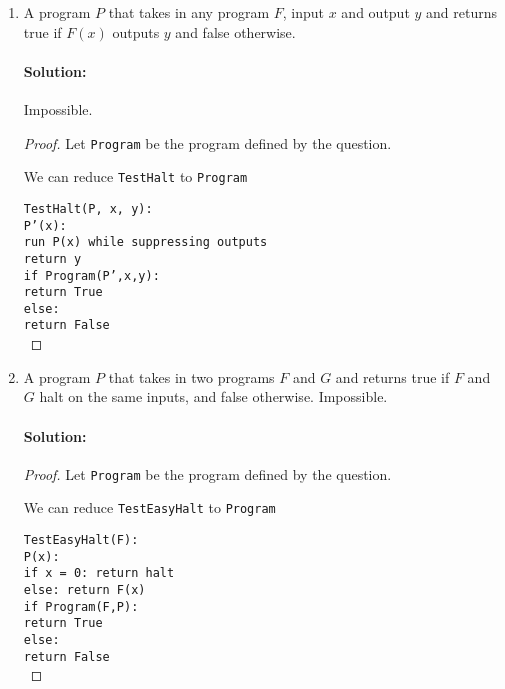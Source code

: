 \documentclass[11pt, notitlepage]{report}
\newenvironment{solution}{\paragraph{Solution:}}{\hfill}
\begin{document}
\begin{enumerate}[label=\alph*.)]

\item A program $P$ that takes in any program $F$, input $x$ and output $y$ and returns 
true if $F(x)$ outputs $y$ and false otherwise.
\begin{solution}Impossible.
\begin{proof} Let \texttt{Program} be the program defined by the question.

	We can reduce \texttt{TestHalt} to \texttt{Program}
	
	\texttt{TestHalt(P, x, y): \\
	\phantom{---}P'(x): \\
	\phantom{---}\phantom{---} run P(x) while suppressing outputs\\
	\phantom{---}\phantom{---} return y\\
	\phantom{---}if Program(P',x,y): \\
	\phantom{---}\phantom{---} return True \\
	\phantom{---}else: \\
	\phantom{---}\phantom{---} return False \\
	}
	
\end{proof}
\end{solution}

\item A program $P$ that takes in two programs $F$ and $G$ and returns true if $F$ and $G$ 
halt on the same inputs, and false otherwise.
Impossible.
\begin{solution}\begin{proof} Let \texttt{Program} be the program defined by the question.

	We can reduce \texttt{TestEasyHalt} to \texttt{Program}
	
	\texttt{TestEasyHalt(F): \\
	\phantom{---}P(x): \\
	\phantom{---}\phantom{---} if x = 0: return halt\\
	\phantom{---}\phantom{---} else: return F(x)\\
	\phantom{---}if Program(F,P): \\
	\phantom{---}\phantom{---} return True \\
	\phantom{---}else: \\
	\phantom{---}\phantom{---} return False \\
	}
	
\end{proof}
\end{solution}
\end{enumerate}
\end{document}
